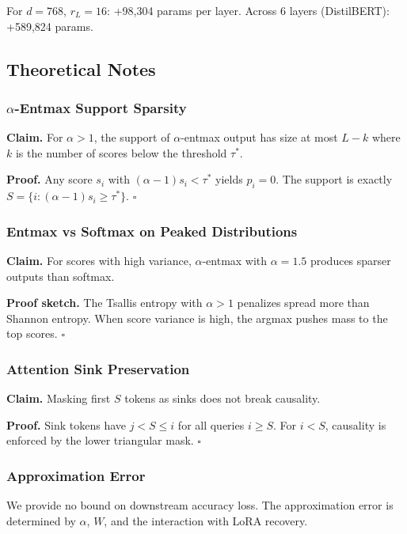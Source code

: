 For $d = 768$, $r_L = 16$: +98,304 params per layer. Across 6 layers 
(DistilBERT): +589,824 params.

\subsection{Theoretical Notes}

\subsubsection{$\alpha$-Entmax Support Sparsity}

\textbf{Claim.} For $\alpha > 1$, the support of $\alpha$-entmax output has size at most 
$L - k$ where $k$ is the number of scores below the threshold $\tau^*$.

\textbf{Proof.} Any score $s_i$ with $(\alpha - 1) s_i < \tau^*$ yields $p_i = 0$. 
The support is exactly $S = \{i : (\alpha - 1) s_i \geq \tau^*\}$. $\square$

\subsubsection{Entmax vs Softmax on Peaked Distributions}

\textbf{Claim.} For scores with high variance, $\alpha$-entmax with $\alpha = 1.5$ 
produces sparser outputs than softmax.

\textbf{Proof sketch.} The Tsallis entropy with $\alpha > 1$ penalizes spread 
more than Shannon entropy. When score variance is high, the argmax pushes 
mass to the top scores. $\square$

\subsubsection{Attention Sink Preservation}

\textbf{Claim.} Masking first $S$ tokens as sinks does not break causality.

\textbf{Proof.} Sink tokens have $j < S \leq i$ for all queries $i \geq S$. 
For $i < S$, causality is enforced by the lower triangular mask. $\square$

\subsubsection{Approximation Error}

We provide no bound on downstream accuracy loss. The approximation error is 
determined by $\alpha$, $W$, and the interaction with LoRA recovery.

